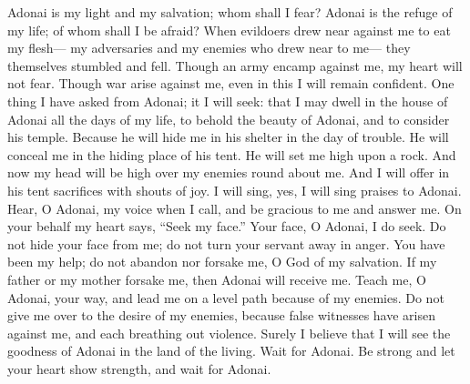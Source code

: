 \begin{biblechapter} %
 Adonai is my light and my salvation; 
whom shall I fear? 
Adonai is the refuge of my life; 
of whom shall I be afraid?
\verse When evildoers drew near against me to eat my flesh— 
my adversaries and my enemies who drew near to me— 
they themselves stumbled and fell.
\verse Though an army encamp against me, 
my heart will not fear. 
Though war arise against me, 
even in this I will remain confident.
\verse One thing I have asked from Adonai; 
it I will seek: 
that I may dwell in the house of Adonai all the days of my life, 
to behold the beauty of Adonai, 
and to consider his temple.
\verse Because he will hide me in his shelter in the day of trouble. 
He will conceal me in the hiding place of his tent. 
He will set me high upon a rock.
\verse And now my head will be high over my enemies round about me. 
And I will offer in his tent sacrifices with shouts of joy. 
I will sing, yes, I will sing praises to Adonai.
\verse Hear, O Adonai, my voice when I call, 
and be gracious to me and answer me.
\verse On your behalf my heart says, “Seek my face.” 
Your face, O Adonai, I do seek.
\verse Do not hide your face from me; 
do not turn your servant away in anger. 
You have been my help; do not abandon nor forsake me, 
O God of my salvation.
\verse If my father or my mother forsake me, 
then Adonai will receive me.
\verse Teach me, O Adonai, your way, 
and lead me on a level path because of my enemies.
\verse Do not give me over to the desire of my enemies, 
because false witnesses have arisen against me, 
and each breathing out violence.
\verse Surely I believe that I will see the goodness of Adonai 
in the land of the living.
\verse Wait for Adonai. 
Be strong and let your heart show strength, 
and wait for Adonai.
\end{biblechapter}

